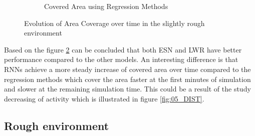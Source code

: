 \documentclass[msc,ai,logo]{infthesis}
\begin{document}
\begin{figure}[H]
\begin{subfigure}[b]{0.49\textwidth}
                \caption{Covered Area using Regression Methods}
               \label{fig:LR_05_AREA}  
        \end{subfigure}
        \caption{Evolution of Area Coverage over time in the slightly rough environment}
         \label{fig:05_AREA}
\end{figure}

Based on the figure \ref{fig:05_AREA} can be concluded that both ESN and LWR have better performance compared to the other models. An interesting difference is that RNNs achieve a more steady increase of covered area over time compared to the regression methods which cover the area faster at the first minutes of simulation and slower at the remaining simulation time. This could be a result of the study decreasing of activity which is illustrated in     figure \ref{fig:05_DIST}. 

\subsection{Rough environment}
\end{document}
